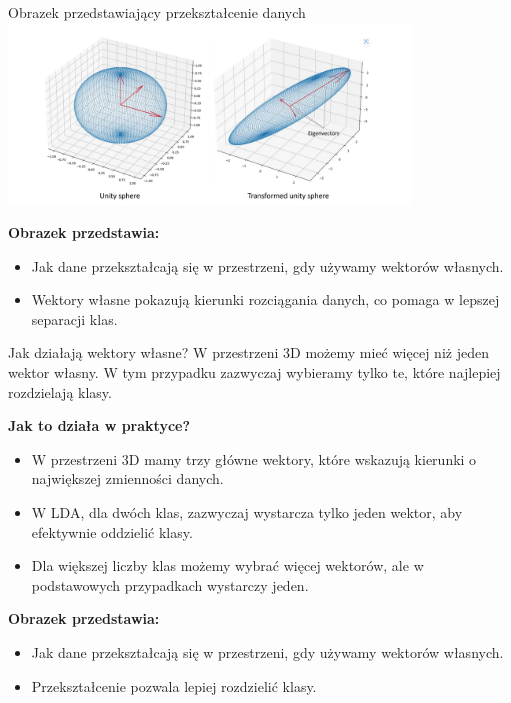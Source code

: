 \documentclass{beamer}
\begin{document}
\begin{frame}{Obrazek przedstawiający przekształcenie danych}
    \includegraphics[width=0.8\textwidth]{unity_transf_unity.png}
    
    \bigskip
    \textbf{Obrazek przedstawia:}
    \begin{itemize}
        \item Jak dane przekształcają się w przestrzeni, gdy używamy wektorów własnych.
        \item Wektory własne pokazują kierunki rozciągania danych, co pomaga w lepszej separacji klas.
    \end{itemize}
\end{frame}



\begin{frame}{Jak działają wektory własne?}
    W przestrzeni 3D możemy mieć więcej niż jeden wektor własny. W tym przypadku zazwyczaj wybieramy tylko te, które najlepiej rozdzielają klasy.

    \bigskip
    \textbf{Jak to działa w praktyce?}  
    \begin{itemize}
        \item W przestrzeni 3D mamy trzy główne wektory, które wskazują kierunki o największej zmienności danych.
        \item W LDA, dla dwóch klas, zazwyczaj wystarcza tylko jeden wektor, aby efektywnie oddzielić klasy.
        \item Dla większej liczby klas możemy wybrać więcej wektorów, ale w podstawowych przypadkach wystarczy jeden.
    \end{itemize}

    \bigskip
    \textbf{Obrazek przedstawia:}
    \begin{itemize}
        \item Jak dane przekształcają się w przestrzeni, gdy używamy wektorów własnych.
        \item Przekształcenie pozwala lepiej rozdzielić klasy.
    \end{itemize}

\end{frame}
\end{document}
